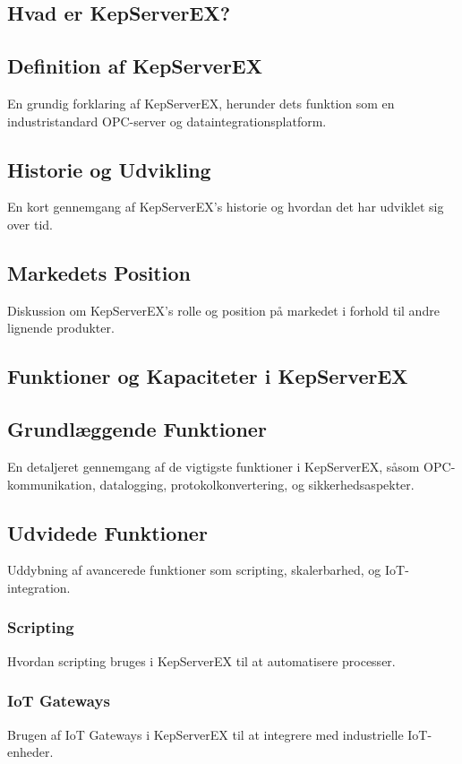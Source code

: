 \subsection{Hvad er KepServerEX?}
\subsection{Definition af KepServerEX}
En grundig forklaring af KepServerEX, herunder dets funktion som en industristandard OPC-server og dataintegrationsplatform.

\subsection{Historie og Udvikling}
En kort gennemgang af KepServerEX's historie og hvordan det har udviklet sig over tid.

\subsection{Markedets Position}
Diskussion om KepServerEX's rolle og position på markedet i forhold til andre lignende produkter.

\subsection{Funktioner og Kapaciteter i KepServerEX}
\subsection{Grundlæggende Funktioner}
En detaljeret gennemgang af de vigtigste funktioner i KepServerEX, såsom OPC-kommunikation, datalogging, protokolkonvertering, og sikkerhedsaspekter.

\subsection{Udvidede Funktioner}
Uddybning af avancerede funktioner som scripting, skalerbarhed, og IoT-integration.

\subsubsection{Scripting}
Hvordan scripting bruges i KepServerEX til at automatisere processer.

\subsubsection{IoT Gateways}
Brugen af IoT Gateways i KepServerEX til at integrere med industrielle IoT-enheder.

